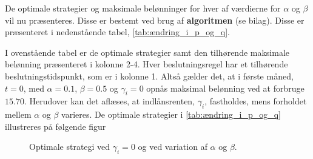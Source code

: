 De optimale strategier og maksimale belønninger for hver af værdierne for $\alpha$ og $\beta$ vil nu præsenteres. Disse er bestemt ved brug af \textbf{algoritmen} (se bilag). Disse er præsenteret i nedenstående tabel, \autoref{tab:ændring_i_p_og_q}.



I ovenstående tabel er de optimale strategier samt den tilhørende maksimale belønning præsenteret i kolonne 2-4. Hver beslutningsregel har et tilhørende beslutningstidspunkt, som er i kolonne 1. Altså gælder det, at i første måned, $t=0$, med $\alpha=0.1$, $\beta=0.5$ og $\gamma_i=0$ opnås maksimal belønning ved at forbruge $15.70$. Herudover kan det aflæses, at indlånsrenten, $\gamma_i$, fastholdes, mens forholdet mellem $\alpha$ og $\beta$ varieres. De optimale strategier i \autoref{tab:ændring_i_p_og_q} illustreres på følgende figur

\begin{figure} [H] 
    \begin{center}
      \resizebox{12cm}{!}{}
    \end{center}
    \caption{Optimale strategi ved $\gamma_i=0$ og ved variation af $\alpha$ og $\beta$.}\label{fig:Optimal_strategi_ved_ændring_i_p}
\end{figure}




% 

% 


